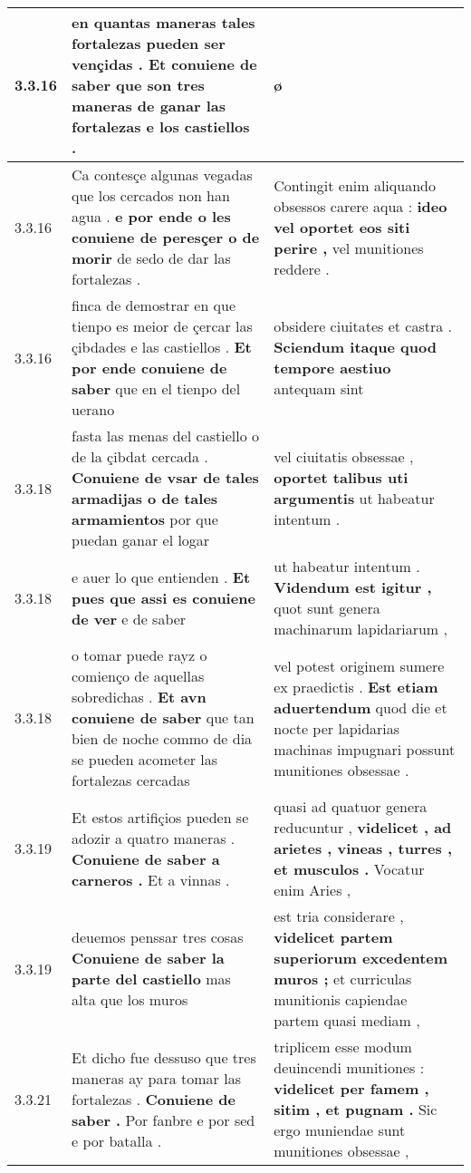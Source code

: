\begin{tabular}{|p{1cm}|p{6.5cm}|p{6.5cm}|}
3.3.16 & en quantas maneras tales fortalezas pueden ser vençidas . \textbf{ Et conuiene de saber } que son tres maneras de ganar las fortalezas e los castiellos . & ø \\\hline
3.3.16 & Ca contesçe algunas vegadas que los cercados non han agua . \textbf{ e por ende o les conuiene de peresçer o de morir } de sedo de dar las fortalezas . & Contingit enim aliquando obsessos carere aqua : \textbf{ ideo vel oportet eos siti perire , } vel munitiones reddere . \\\hline
3.3.16 & finca de demostrar en que tienpo es meior de çercar las çibdades e las castiellos . \textbf{ Et por ende conuiene de saber } que en el tienpo del uerano & obsidere ciuitates et castra . \textbf{ Sciendum itaque quod tempore aestiuo } antequam sint \\\hline
3.3.18 & fasta las menas del castiello o de la çibdat cercada . \textbf{ Conuiene de vsar de tales armadijas o de tales armamientos } por que puedan ganar el logar & vel ciuitatis obsessae , \textbf{ oportet talibus uti argumentis } ut habeatur intentum . \\\hline
3.3.18 & e auer lo que entienden . \textbf{ Et pues que assi es conuiene de ver } e de saber & ut habeatur intentum . \textbf{ Videndum est igitur , } quot sunt genera machinarum lapidariarum , \\\hline
3.3.18 & o tomar puede rayz o comienço de aquellas sobredichas . \textbf{ Et avn conuiene de saber } que tan bien de noche commo de dia se pueden acometer las fortalezas cercadas & vel potest originem sumere ex praedictis . \textbf{ Est etiam aduertendum } quod die et nocte per lapidarias machinas impugnari possunt munitiones obsessae . \\\hline
3.3.19 & Et estos artifiçios pueden se adozir a quatro maneras . \textbf{ Conuiene de saber a carneros . } Et a vinnas . & quasi ad quatuor genera reducuntur , \textbf{ videlicet , ad arietes , vineas , turres , et musculos . } Vocatur enim Aries , \\\hline
3.3.19 & deuemos penssar tres cosas \textbf{ Conuiene de saber la parte del castiello } mas alta que los muros & est tria considerare , \textbf{ videlicet partem superiorum excedentem muros ; } et curriculas munitionis capiendae partem quasi mediam , \\\hline
3.3.21 & Et dicho fue dessuso que tres maneras ay para tomar las fortalezas . \textbf{ Conuiene de saber . } Por fanbre e por sed e por batalla . & triplicem esse modum deuincendi munitiones : \textbf{ videlicet per famem , sitim , et pugnam . } Sic ergo muniendae sunt munitiones obsessae , \\\hline

\end{tabular}

